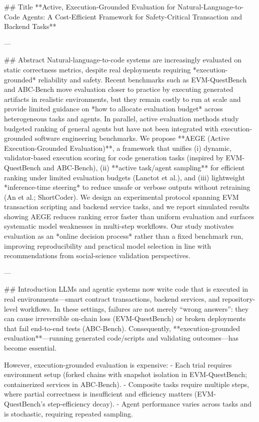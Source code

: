 ## Title  
**Active, Execution-Grounded Evaluation for Natural-Language-to-Code Agents: A Cost-Efficient Framework for Safety-Critical Transaction and Backend Tasks**

---

## Abstract  
Natural-language-to-code systems are increasingly evaluated on static correctness metrics, despite real deployments requiring *execution-grounded* reliability and safety. Recent benchmarks such as EVM-QuestBench and ABC-Bench move evaluation closer to practice by executing generated artifacts in realistic environments, but they remain costly to run at scale and provide limited guidance on *how to allocate evaluation budget* across heterogeneous tasks and agents. In parallel, active evaluation methods study budgeted ranking of general agents but have not been integrated with execution-grounded software engineering benchmarks. We propose **AEGE (Active Execution-Grounded Evaluation)**, a framework that unifies (i) dynamic, validator-based execution scoring for code generation tasks (inspired by EVM-QuestBench and ABC-Bench), (ii) **active task/agent sampling** for efficient ranking under limited evaluation budgets (Lanctot et al.), and (iii) lightweight *inference-time steering* to reduce unsafe or verbose outputs without retraining (An et al.; ShortCoder). We design an experimental protocol spanning EVM transaction scripting and backend service tasks, and we report simulated results showing AEGE reduces ranking error faster than uniform evaluation and surfaces systematic model weaknesses in multi-step workflows. Our study motivates evaluation as an *online decision process* rather than a fixed benchmark run, improving reproducibility and practical model selection in line with recommendations from social-science validation perspectives.

---

## Introduction  
LLMs and agentic systems now write code that is executed in real environments—smart contract transactions, backend services, and repository-level workflows. In these settings, failures are not merely “wrong answers”: they can cause irreversible on-chain loss (EVM-QuestBench) or broken deployments that fail end-to-end tests (ABC-Bench). Consequently, **execution-grounded evaluation**—running generated code/scripts and validating outcomes—has become essential.

However, execution-grounded evaluation is expensive:
- Each trial requires environment setup (forked chains with snapshot isolation in EVM-QuestBench; containerized services in ABC-Bench).
- Composite tasks require multiple steps, where partial correctness is insufficient and efficiency matters (EVM-QuestBench’s step-efficiency decay).
- Agent performance varies across tasks and is stochastic, requiring repeated sampling.

